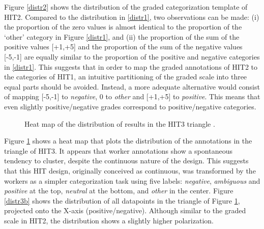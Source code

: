 \documentclass[11pt]{elsarticle}
\begin{document}
Figure \ref{distr2} shows the distribution of the graded categorization template of HIT2. Compared to the distribution in \ref{distr1}, two observations can be made: (i) the proportion of the zero values is almost identical to the proportion of the `other' category in Figure \ref{distr1}, and (ii) the proportion of the sum of the positive values [+1,+5] and the proportion of the sum of the negative values [-5,-1] are equally similar to the proportion of the positive and negative categories in \ref{distr1}. This suggests that in order to map the graded annotations of HIT2 to the categories of HIT1, an intuitive partitioning of the graded scale into three equal parts should be avoided. Instead, a more adequate alternative would consist of mapping [-5,-1] to \textit{negative}, 0 to \textit{other} and [+1,+5] to \textit{positive}. This means that even slightly positive/negative grades correspond to positive/negative categories.



\begin{figure}[h]
  \begin{center}
\caption{Heat map of the distribution of results in the HIT3 triangle .}
\label{distr3}
  \end{center}
\end{figure}

Figure \ref{distr3} shows a heat map that plots the distribution of the annotations in the triangle of HIT3. It appears that worker annotations show a spontaneous tendency to cluster, despite the continuous nature of the design. This suggests that this HIT design, originally conceived as continuous, was transformed by the workers as a simpler categorization task using five labels: \textit{negative}, \textit{ambiguous} and \textit{positive} at the top, \textit{neutral} at the bottom, and \textit{other} in the center.
Figure \ref{distr3b} shows the distribution of all datapoints in the triangle of Figure \ref{distr3}, projected onto the X-axis (positive/negative). Although similar to the graded scale in HIT2, the distribution shows a slightly higher polarization.
\end{document}
